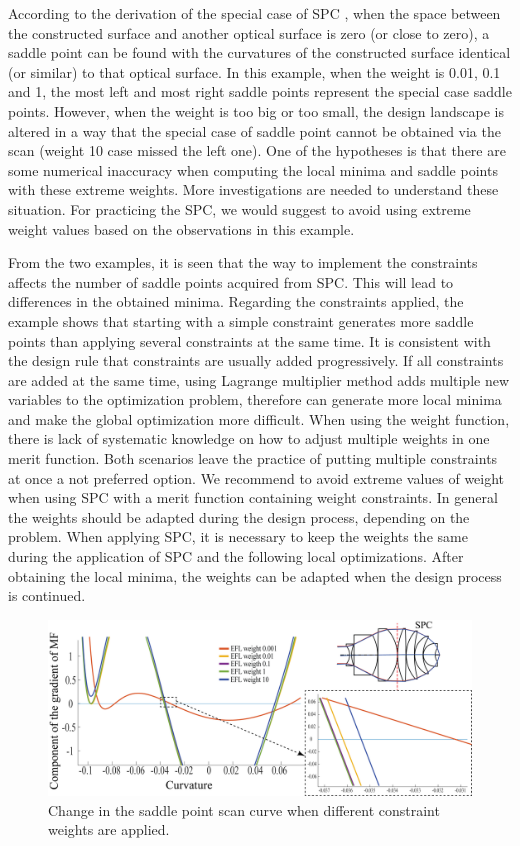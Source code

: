 According to the derivation of the special case of SPC \cite{BociortSPCSexplained}, when the space between the constructed surface and another optical surface is zero (or close to zero), a saddle point can be found with the curvatures of the constructed surface identical (or similar) to that optical surface. In this example, when the weight is 0.01, 0.1 and 1, the most left and most right saddle points represent the special case saddle points. However, when the weight is too big or too small, the design landscape is altered in a way that the special case of saddle point cannot be obtained via the scan (weight 10 case missed the left one). One of the hypotheses is that there are some numerical inaccuracy when computing the local minima and saddle points with these extreme weights. More investigations are needed to understand these situation. For practicing the SPC, we would suggest to avoid using extreme weight values based on the observations in this example. 

From the two examples, it is seen that the way to implement the constraints affects the number of saddle points acquired from SPC. This will lead to differences in the obtained minima. Regarding the constraints applied, the example shows that starting with a simple constraint generates more saddle points than applying several constraints at the same time. It is consistent with the design rule that constraints are usually added progressively. If all constraints are added at the same time, using Lagrange multiplier method adds multiple new variables to the optimization problem, therefore can generate more local minima and make the global optimization more difficult.  When using the weight function, there is lack of systematic knowledge on how to adjust multiple weights in one merit function. Both scenarios leave the practice of putting multiple constraints at once a not preferred option. We recommend to avoid extreme values of weight when using SPC with a merit function containing weight constraints. In general the weights should be adapted during the design process, depending on the problem. When applying SPC, it is necessary to keep the weights the same during the application of SPC and the following local optimizations. After obtaining the local minima, the weights can be adapted when the design process is continued. 

\begin{figure}[h!]
    \centering
    \includegraphics[width=\textwidth]{chapter-4/figures/Vollrath_wt_change.png}
    \caption{Change in the saddle point scan curve when different constraint weights are applied.}
    \label{fig: vollrath_wt_change}
\end{figure}

